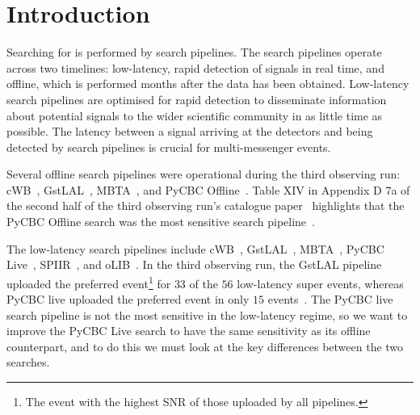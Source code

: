 
\section{\label{5:sec:introduction}Introduction}

Searching for \gws is performed by search pipelines. The search pipelines operate across two timelines: low-latency, rapid detection of \gwadj signals in real time, and offline, which is performed months after the data has been obtained. Low-latency search pipelines are optimised for rapid detection to disseminate information about potential \gwadj signals to the wider scientific community in as little time as possible. The latency between a \gwadj signal arriving at the detectors and being detected by search pipelines is crucial for multi-messenger events.

Several offline \gwadj search pipelines were operational during the third observing run: cWB~\cite{cWB:2020}, GstLAL~\cite{GstLAL:2020}, MBTA~\cite{MBTA:2021}, and PyCBC Offline~\cite{PyCBC_global:2020}. Table XIV in Appendix D 7a of the second half of the third observing run's catalogue paper~\cite{gwtc3:2023} highlights that the PyCBC Offline search was the most sensitive \gwadj search pipeline~\cite{PyCBC:2016, PyCBC:2017, PyCBC_package:2021}.

The low-latency \gwadj search pipelines include cWB~\cite{cWB:2020}, GstLAL~\cite{GstLAL:2020}, MBTA~\cite{MBTA:2021}, PyCBC Live~\cite{PyCBC_Live:2018}, SPIIR~\cite{SPIIR:2020}, and oLIB~\cite{oLIB:2015}. In the third observing run, the GstLAL pipeline~\cite{GstLAL:2020} uploaded the preferred event\footnote{The event with the highest SNR of those uploaded by all pipelines.} for $33$ of the $56$ low-latency super events, whereas PyCBC live uploaded the preferred event in only $15$ events~\cite{gracedb_superevents:2024}. The PyCBC live search pipeline is not the most sensitive in the low-latency regime, so we want to improve the PyCBC Live search to have the same sensitivity as its offline counterpart, and to do this we must look at the key differences between the two searches.

